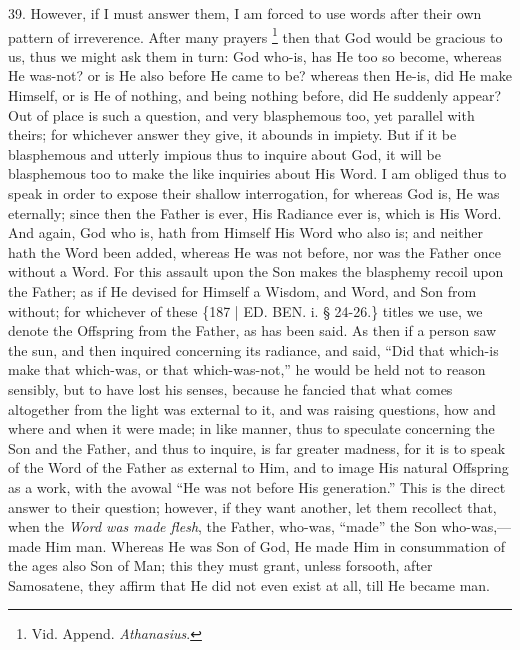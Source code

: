 39. However, if I must answer
them, I am forced to use words after their own pattern of irreverence.
After many prayers \footnote{Vid. Append. \emph{Athanasius}.}
then that God would be gracious to us, thus we might ask them in turn:
God who-is, has He too so become, whereas He was-not? or is He also
before He came to be? whereas then He-is, did He make Himself, or is
He of nothing, and being nothing before, did He suddenly appear? Out
of place is such a question, and very blasphemous too, yet parallel
with theirs; for whichever answer they give, it abounds in impiety.
But if it be blasphemous and utterly impious thus to inquire about
God, it will be blasphemous too to make the like inquiries about His
Word. I am obliged thus to speak in order to expose their shallow
interrogation, for whereas God is, He was eternally; since then the
Father is ever, His Radiance ever is, which is His Word. And again,
God who is, hath from Himself His Word who also is; and neither hath
the Word been added, whereas He was not before, nor was the Father
once without a Word. For this assault upon the Son makes the blasphemy
recoil upon the Father; as if He devised for Himself a Wisdom, and
Word, and Son from without; for whichever of these \{187 | ED. BEN. i. § 24-26.\}
titles we use, we denote the Offspring from the Father, as has been
said. As then if a person saw the sun, and then inquired concerning
its radiance, and said, ``Did that which-is make that which-was, or
that which-was-not,'' he would be held not to reason sensibly, but to
have lost his senses, because he fancied that what comes altogether
from the light was external to it, and was raising questions, how and
where and when it were made; in like manner, thus to speculate
concerning the Son and the Father, and thus to inquire, is far greater
madness, for it is to speak of the Word of the Father as external to
Him, and to image His natural Offspring as a work, with the avowal ``He
was not before His generation.'' This is the direct answer to their
question; however, if they want another, let them recollect that, when
the \emph{Word was made flesh}, the Father, who-was, ``made'' the Son
who-was,—made Him man. Whereas He was Son of God, He made Him in
consummation of the ages also Son of Man; this they must grant, unless
forsooth, after Samosatene, they affirm that He did not even exist at
all, till He became man.

